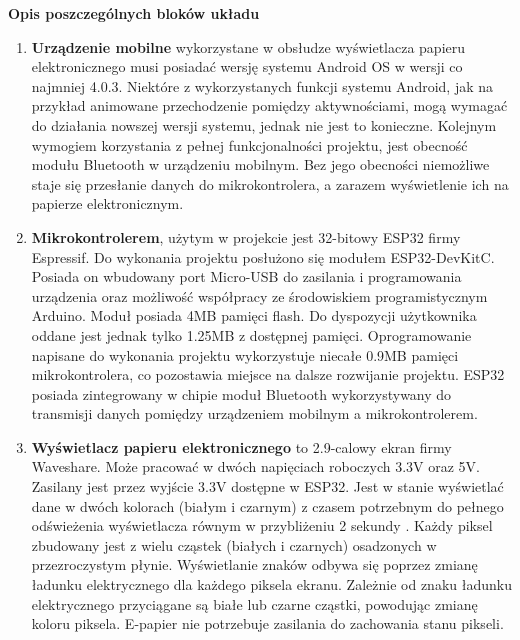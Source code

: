 \documentclass[a4paper,12pt, twoside]{article}
\begin{document}
        \begin{flushleft}
        \textbf{Opis poszczególnych bloków układu}
        \end{flushleft}
        \begin{enumerate}
            \item \textbf{Urządzenie mobilne} wykorzystane w obsłudze wyświetlacza papieru elektronicznego musi posiadać wersję systemu Android OS w wersji co najmniej 4.0.3. Niektóre z wykorzystanych funkcji systemu Android, jak na przykład animowane przechodzenie pomiędzy aktywnościami, mogą wymagać do działania nowszej wersji systemu, jednak nie jest to konieczne.
            Kolejnym wymogiem korzystania z pełnej funkcjonalności projektu, jest obecność modułu Bluetooth w urządzeniu mobilnym. Bez jego obecności niemożliwe staje się przesłanie danych do mikrokontrolera, a zarazem wyświetlenie ich na papierze elektronicznym.
        
    	    \item \textbf{Mikrokontrolerem}, użytym w projekcie jest 32-bitowy ESP32 firmy Espressif. Do wykonania projektu posłużono się modułem ESP32-DevKitC. Posiada on wbudowany port Micro-USB do zasilania i programowania urządzenia oraz możliwość współpracy ze środowiskiem programistycznym Arduino. Moduł posiada 4MB pamięci flash\cite{flash}. Do dyspozycji użytkownika oddane jest jednak tylko 1.25MB z dostępnej pamięci. Oprogramowanie napisane do wykonania projektu wykorzystuje niecałe 0.9MB pamięci mikrokontrolera, co pozostawia miejsce na dalsze rozwijanie projektu. ESP32 posiada zintegrowany w chipie moduł Bluetooth wykorzystywany do transmisji danych pomiędzy urządzeniem mobilnym a mikrokontrolerem.
    
    
            \item \textbf{Wyświetlacz papieru elektronicznego} to 2.9-calowy ekran firmy Waveshare. Może pracować w dwóch napięciach roboczych 3.3V oraz 5V. Zasilany jest przez wyjście 3.3V dostępne w ESP32. Jest w stanie wyświetlać dane w dwóch kolorach (białym i czarnym) z czasem potrzebnym do pełnego odświeżenia wyświetlacza równym w przybliżeniu 2 sekundy \cite{waveshare}. Każdy piksel zbudowany jest z wielu cząstek (białych i czarnych) osadzonych w przezroczystym płynie. Wyświetlanie znaków odbywa się poprzez zmianę ładunku elektrycznego dla każdego piksela ekranu. Zależnie od znaku ładunku elektrycznego przyciągane są białe lub czarne cząstki, powodując zmianę koloru piksela. E-papier nie potrzebuje zasilania do zachowania stanu pikseli.
            

\end{enumerate}
\end{document}
